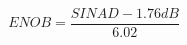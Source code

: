 \documentclass{article}
\begin{document}
\begin{equation}
ENOB = \frac{SINAD - 1.76 dB}{6.02}
\end{equation}
\end{document}
